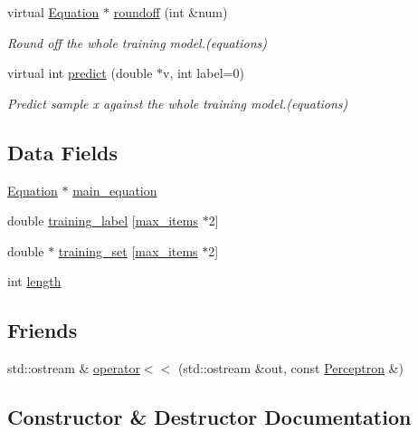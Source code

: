 \begin{DoxyCompactItemize}
virtual \hyperlink{classEquation}{Equation} $\ast$ \hyperlink{classPerceptron_a5408f0ea545d06bbef6630071c73fea2}{roundoff} (int \&num)
\begin{DoxyCompactList}\small\item\em Round off the whole training model.(equations) \end{DoxyCompactList}\item 
virtual int \hyperlink{classPerceptron_a414600a1f189c4f44c858b87048ae655}{predict} (double $\ast$v, int label=0)
\begin{DoxyCompactList}\small\item\em Predict sample x against the whole training model.(equations) \end{DoxyCompactList}\end{DoxyCompactItemize}
\subsection*{Data Fields}
\begin{DoxyCompactItemize}
\item 
\hyperlink{classEquation}{Equation} $\ast$ \hyperlink{classPerceptron_ae021428eb8cf08ebb46383fbc0ea1c46}{main\+\_\+equation}
\item 
double \hyperlink{classPerceptron_a7b395bb8dd492268fc2324c275b8ca4c}{training\+\_\+label} \mbox{[}\hyperlink{config_8h_ab763a0a7202006efe98fe9953784e6a9}{max\+\_\+items} $\ast$2\mbox{]}
\item 
double $\ast$ \hyperlink{classPerceptron_af93816c52b31be423764b53c22733a01}{training\+\_\+set} \mbox{[}\hyperlink{config_8h_ab763a0a7202006efe98fe9953784e6a9}{max\+\_\+items} $\ast$2\mbox{]}
\item 
int \hyperlink{classPerceptron_a996b4296c5e5e4950099a8fe0b37b9df}{length}
\end{DoxyCompactItemize}
\subsection*{Friends}
\begin{DoxyCompactItemize}
\item 
std\+::ostream \& \hyperlink{classPerceptron_a829793c1338f5ab9c9e7e63b6c63be21}{operator$<$$<$} (std\+::ostream \&out, const \hyperlink{classPerceptron}{Perceptron} \&)
\end{DoxyCompactItemize}


\subsection{Constructor \& Destructor Documentation}
